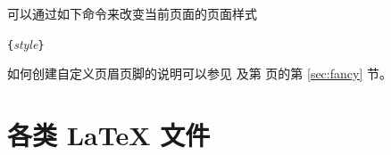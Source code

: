 可以通过如下命令来改变当前页面的页面样式
\begin{lscommand}
\verb|{|\emph{style}\verb|}|
\end{lscommand}
如何创建自定义页眉页脚的说明可以参见 \companion{} 及第 \pageref{sec:fancy} 页的第 \ref{sec:fancy} 节。
%
%

\section{各类 \LaTeX{} 文件}

